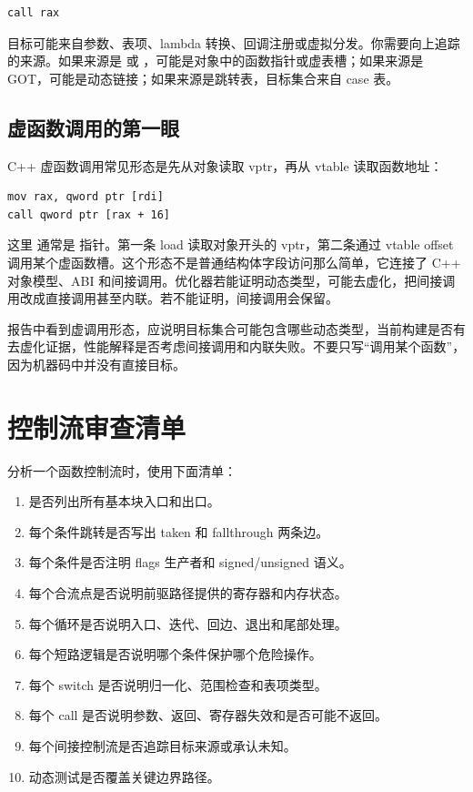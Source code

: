 \begin{lstlisting}
call rax
\end{lstlisting}

目标可能来自参数、表项、lambda 转换、回调注册或虚拟分发。你需要向上追踪  的来源。如果来源是 \code{[rdi]} 或 ，可能是对象中的函数指针或虚表槽；如果来源是 GOT，可能是动态链接；如果来源是跳转表，目标集合来自 case 表。

\subsection{虚函数调用的第一眼}

C++ 虚函数调用常见形态是先从对象读取 vptr，再从 vtable 读取函数地址：

\begin{lstlisting}
mov rax, qword ptr [rdi]
call qword ptr [rax + 16]
\end{lstlisting}

这里  通常是  指针。第一条 load 读取对象开头的 vptr，第二条通过 vtable offset 调用某个虚函数槽。这个形态不是普通结构体字段访问那么简单，它连接了 C++ 对象模型、ABI 和间接调用。优化器若能证明动态类型，可能去虚化，把间接调用改成直接调用甚至内联。若不能证明，间接调用会保留。

报告中看到虚调用形态，应说明目标集合可能包含哪些动态类型，当前构建是否有去虚化证据，性能解释是否考虑间接调用和内联失败。不要只写“调用某个函数”，因为机器码中并没有直接目标。

\section{控制流审查清单}

分析一个函数控制流时，使用下面清单：

\begin{enumerate}
  \item 是否列出所有基本块入口和出口。
  \item 每个条件跳转是否写出 taken 和 fallthrough 两条边。
  \item 每个条件是否注明 flags 生产者和 signed/unsigned 语义。
  \item 每个合流点是否说明前驱路径提供的寄存器和内存状态。
  \item 每个循环是否说明入口、迭代、回边、退出和尾部处理。
  \item 每个短路逻辑是否说明哪个条件保护哪个危险操作。
  \item 每个 switch 是否说明归一化、范围检查和表项类型。
  \item 每个 call 是否说明参数、返回、寄存器失效和是否可能不返回。
  \item 每个间接控制流是否追踪目标来源或承认未知。
  \item 动态测试是否覆盖关键边界路径。
\end{enumerate}

